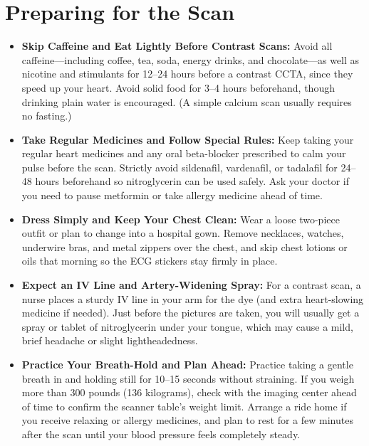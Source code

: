 \section{Preparing for the Scan}
\begin{itemize}
    \item \textbf{Skip Caffeine and Eat Lightly Before Contrast Scans:} Avoid all caffeine---including coffee, tea, soda, energy drinks, and chocolate---as well as nicotine and stimulants for 12--24 hours before a contrast CCTA, since they speed up your heart. Avoid solid food for 3--4 hours beforehand, though drinking plain water is encouraged. (A simple calcium scan usually requires no fasting.)
    \item \textbf{Take Regular Medicines and Follow Special Rules:} Keep taking your regular heart medicines and any oral beta-blocker prescribed to calm your pulse before the scan. Strictly avoid sildenafil, vardenafil, or tadalafil for 24--48 hours beforehand so nitroglycerin can be used safely. Ask your doctor if you need to pause metformin or take allergy medicine ahead of time.
    \item \textbf{Dress Simply and Keep Your Chest Clean:} Wear a loose two-piece outfit or plan to change into a hospital gown. Remove necklaces, watches, underwire bras, and metal zippers over the chest, and skip chest lotions or oils that morning so the ECG stickers stay firmly in place.
    \item \textbf{Expect an IV Line and Artery-Widening Spray:} For a contrast scan, a nurse places a sturdy IV line in your arm for the dye (and extra heart-slowing medicine if needed). Just before the pictures are taken, you will usually get a spray or tablet of nitroglycerin under your tongue, which may cause a mild, brief headache or slight lightheadedness.
    \item \textbf{Practice Your Breath-Hold and Plan Ahead:} Practice taking a gentle breath in and holding still for 10--15 seconds without straining. If you weigh more than 300 pounds (136 kilograms), check with the imaging center ahead of time to confirm the scanner table's weight limit. Arrange a ride home if you receive relaxing or allergy medicines, and plan to rest for a few minutes after the scan until your blood pressure feels completely steady.
\end{itemize}

